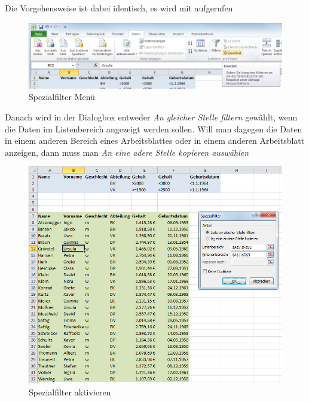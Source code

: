 Die Vorgehensweise ist dabei identisch, es wird mit  aufgerufen
	\begin{figure}[H]
		\centering
			\includegraphics[scale=0.65]{images/spezialfilter-menu}
		\caption{Spezialfilter Menü}
		\label{fig:spezialfilterMenu}
	\end{figure}
	\vspace{-1em}
Danach wird in der Dialogbox entweder \textit{An gleicher Stelle filtern} gewählt, wenn die Daten im Listenbereich angezeigt werden sollen. Will man dagegen die Daten in einem anderen Bereich eines Arbeitsblattes oder in einem anderen Arbeitsblatt anzeigen, dann muss man \textit{An eine adere Stelle kopieren auswählen}
\enlargethispage{1cm}
	\begin{figure}[H]
		\centering
			\includegraphics[scale=0.65]{images/spezialfilter-dialogbox}
		\caption{Spezialfilter aktivieren}
		\label{fig:spezialfilterAktivieren}
	\end{figure}

